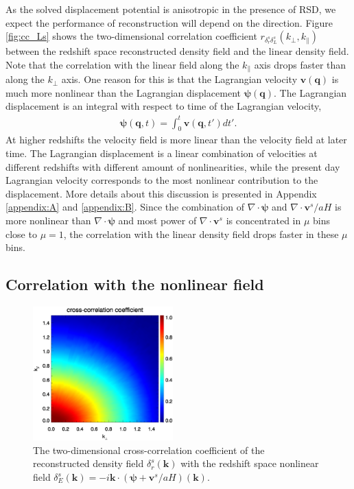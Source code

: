 \documentclass[aps,prx,twocolumn,superscriptaddress,groupedaddress,nofootinbib,amsfont]{revtex4}  %
\newcommand{\bea}{\begin{eqnarray}}
\newcommand{\eea}{\end{eqnarray}}
\newcommand{\bmp}{\bm{\psi}}
\newcommand{\bmv}{\bm{v}}
\newcommand{\bmk}{\bm{k}}
\newcommand{\bmq}{\bm{q}}
\begin{document}
As the solved displacement potential is anisotropic in the presence of RSD, we
expect the performance of reconstruction will depend on the direction.
Figure \ref{fig:cc_Ls} shows the two-dimensional correlation coefficient $r_{\delta_r^s\delta_L^s}(k_\perp, k_\parallel)$ between the redshift space reconstructed density field and the linear density field. 
Note that the correlation with the linear field along the $k_\parallel$ axis
drops faster than along the $k_\perp$ axis.
One reason for this is that the Lagrangian velocity $\bmv(\bmq)$ is much more 
nonlinear than the Lagrangian displacement $\bmp(\bmq)$. The Lagrangian 
displacement is an integral with respect to time of the Lagrangian velocity,
\bea
\bmp(\bmq,t)=\int_0^t\bmv(\bmq,t')dt'.
\eea
At higher redshifts the velocity field is more linear than the velocity field 
at later time. The Lagrangian displacement is a linear combination of velocities
at different redshifts with different amount of nonlinearities, while the 
present day Lagrangian velocity corresponds to the most nonlinear contribution
to the displacement. More details about this discussion is presented in Appendix
\ref{appendix:A} and \ref{appendix:B}.
Since the combination of $\nabla\cdot\bmp$ and $\nabla\cdot\bmv^s/aH$ is more
nonlinear than $\nabla\cdot\bmp$ and most power of $\nabla\cdot\bmv^s$ is 
concentrated in $\mu$ bins close to $\mu=1$, the correlation with the linear 
density field drops faster in these $\mu$ bins.

\subsection{Correlation with the nonlinear field}

\begin{figure}[tbp]
\begin{center}
\includegraphics[width=0.48\textwidth]{0.000anixcc_deltaRsxEs_4x.eps}
\end{center}
\vspace{-0.7cm}
\caption{The two-dimensional cross-correlation coefficient of the reconstructed
density field $\delta_r^s(\bmk)$ with the redshift space nonlinear field 
$\delta_E^s(\bmk)=-i\bmk\cdot(\bmp+\bmv^s/aH)(\bmk)$.}
\label{fig:cc_Es}
\end{figure}
\end{document}
